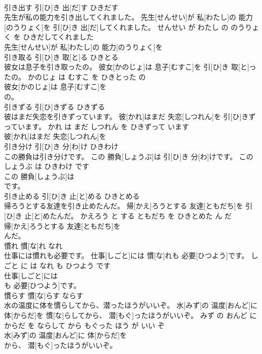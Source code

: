 \documentclass[8pt]{extreport}
\begin{document}
\begin{CJK}{UTF8}{min}
\\	引き出す	引[ひ]き 出[だ]す	ひきだす	
\\	先生が私の能力を引き出してくれました。	先生[せんせい]が 私[わたし]の 能力[のうりょく]を 引[ひ]き 出[だ]してくれました。	せんせい が わたし の のうりょく を ひきだしてくれました	
\\	先生[せんせい]が 私[わたし]の 能力[のうりょく]を
\\	引き取る	引[ひ]き 取[と]る	ひきとる	
\\	彼女は息子を引き取ったの。	彼女[かのじょ]は 息子[むすこ]を 引[ひ]き 取[と]ったの。	かのじょ は むすこ を ひきとった の	
\\	彼女[かのじょ]は 息子[むすこ]を
\\	の。			
\\	引きずる	引[ひ]きずる	ひきずる	
\\	彼はまだ失恋を引きずっています。	彼[かれ]はまだ 失恋[しつれん]を 引[ひ]きずっています。	かれ は まだ しつれん を ひきずって います	
\\	彼[かれ]はまだ 失恋[しつれん]を
\\	引き分け	引[ひ]き 分[わ]け	ひきわけ	
\\	この勝負は引き分けです。	この 勝負[しょうぶ]は 引[ひ]き 分[わ]けです。	この しょうぶ は ひきわけ です	
\\	この 勝負[しょうぶ]は
\\	です。			
\\	引き止める	引[ひ]き 止[と]める	ひきとめる	
\\	帰ろうとする友達を引き止めたんだ。	帰[かえ]ろうとする 友達[ともだち]を 引[ひ]き 止[と]めたんだ。	かえろう と する ともだち を ひきとめた ん だ	
\\	帰[かえ]ろうとする 友達[ともだち]を
\\	んだ。			
\\	慣れ	慣[な]れ	なれ	
\\	仕事には慣れも必要です。	仕事[しごと]には 慣[な]れも 必要[ひつよう]です。	しごと に は なれ も ひつよう です	
\\	仕事[しごと]には
\\	も 必要[ひつよう]です。			
\\	慣らす	慣[な]らす	ならす	
\\	水の温度に体を慣らしてから、潜ったほうがいいぞ。	水[みず]の 温度[おんど]に 体[からだ]を 慣[な]らしてから、 潜[もぐ]ったほうがいいぞ。	みず の おんど に からだ を ならして から もぐった ほう が いい ぞ	
\\	水[みず]の 温度[おんど]に 体[からだ]を
\\	から、 潜[もぐ]ったほうがいいぞ。			

\end{CJK}
\end{document}
